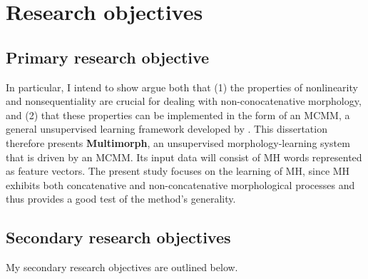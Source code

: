 
\section{Research objectives}
\subsection{Primary research objective}
In particular, I intend to show 
argue both that (1) the properties of nonlinearity and nonsequentiality are crucial for dealing with non-conocatenative
morphology, and (2) that these properties can 
be implemented in the form of 
an \ac{MCMM}, 
a general unsupervised learning framework developed by \cite{saund:94}. 
This dissertation therefore presents \textbf{Multimorph}, an unsupervised morphology-learning system that is driven by an MCMM.
Its input data will consist of \ac{MH} words represented as feature vectors. 
The present study focuses on the learning of \ac{MH}, since \ac{MH}
exhibits both concatenative and non-concatenative morphological processes 
and thus provides a good test of the method's generality.

\subsection{Secondary research objectives}
\label{sec:secondary-objectives}
My secondary research objectives are outlined below. %
